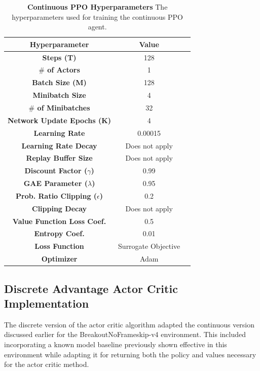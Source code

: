 \documentclass[conference]{IEEEtran}
\begin{document}
\begin{table}[htbp]
    \caption{\textbf{Continuous PPO Hyperparameters}  The hyperparameters used for training the continuous PPO agent.}
\begin{center}
\begin{tabular}{|c|c|c|}
\hline
\textbf{Hyperparameter} & \textbf{Value} \\
\hline
\textbf{Steps (T)} & 128 \\
\hline
\textbf{$\#$ of Actors} & 1 \\
\hline
\textbf{Batch Size (M)} & 128 \\
\hline
\textbf{Minibatch Size} & 4 \\
\hline
\textbf{$\#$ of Minibatches} & 32 \\
\hline
\textbf{Network Update Epochs (K)} & 4 \\
\hline
\textbf{Learning Rate} & 0.00015 \\
\hline
\textbf{Learning Rate Decay} & Does not apply \\
\hline
\textbf{Replay Buffer Size} & Does not apply \\
\hline
\textbf{Discount Factor ($\gamma$)} & 0.99 \\
\hline
\textbf{GAE Parameter ($\lambda$)} & 0.95 \\
\hline
\textbf{Prob. Ratio Clipping ($\epsilon$)} & 0.2\\
\hline
\textbf{Clipping Decay} & Does not apply \\
\hline
\textbf{Value Function Loss Coef.} & 0.5 \\
\hline
\textbf{Entropy Coef.} & 0.01 \\
\hline
\textbf{Loss Function} & Surrogate Objective \\
\hline
\textbf{Optimizer} & Adam \\
\hline
\end{tabular}
\label{table:continuousPPOHypers}
\end{center}
\end{table}

\subsection{Discrete Advantage Actor Critic Implementation}
The discrete version of the actor critic algorithm adapted the continuous version discussed earlier for the BreakoutNoFrameskip-v4 environment.
This included incorporating a known model baseline previously shown effective in this environment while adapting it for returning both the policy and values necessary for the actor critic method.
\end{document}
